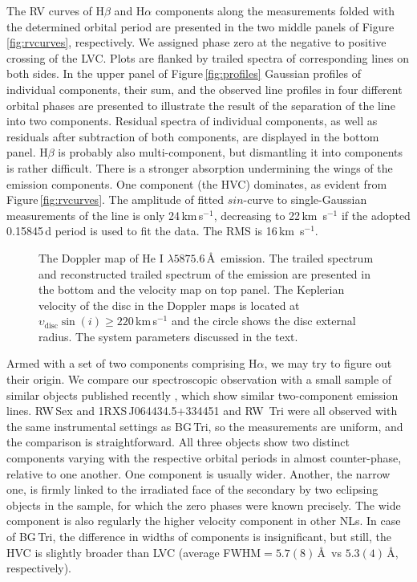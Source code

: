 \documentclass[fleqn,usenatbib]{mnras}
\def\bg{BG\,Tri}
\begin{document}
The RV curves of H$\beta$  and H$\alpha$ components along the measurements folded with the determined orbital period are presented in the two
middle panels of Figure\,\ref{fig:rvcurves}, respectively. We assigned phase zero at the negative to positive crossing of the LVC.  Plots are
flanked by trailed spectra of corresponding lines on both sides.
In the upper panel of Figure\,\ref{fig:profiles} Gaussian profiles of individual components, their sum, and the observed line profiles in four
different orbital phases are presented to illustrate the result of the separation of the line  into two components. Residual spectra of individual components,  as well as residuals after subtraction of both components, are displayed in the bottom panel.
H$\beta$ is probably also multi-component, but dismantling  it into components is rather difficult. There is a stronger absorption
undermining the wings of the emission components. One component (the HVC) dominates, as evident from Figure\,\ref{fig:rvcurves}. The amplitude of fitted $sin$-curve to single-Gaussian measurements of the line is only 24\,km\,s$^{-1}$, decreasing to 22\,km~s$^{-1}$ if the adopted 0.15845\,d
period is used to fit the data. The RMS is 16\,km~s$^{-1}$. 


\begin{figure}
\setlength{\unitlength}{1mm}
\caption{The Doppler map of He I $\lambda5875.6$\,\AA\ emission. The trailed spectrum and reconstructed trailed spectrum of
the emission are presented in the bottom and the velocity map on top panel. 
The Keplerian velocity of the disc in the Doppler maps is located at $ \upsilon_{\mathrm {disc}}\sin (i) \ge 220$\,km\,s$^{-1}$ and the circle
shows the disc external radius. The system parameters discussed in the text.}
\label{fig:tomohei}
\end{figure}



Armed with a set of two components comprising  H$\alpha$,   we may try to figure out their origin. 
We compare our spectroscopic observation with a small sample of similar objects published recently
\citep{2017MNRAS.464..104H,2017MNRAS.470.1960H}, which show  similar two-component emission lines. 
RW\,Sex and 1RXS\,J064434.5+334451 \citep{2017MNRAS.470.1960H} and  RW\, Tri \citep{Subebekova20} were all observed with the same instrumental
settings as \bg, so the measurements are uniform, and the comparison is straightforward. All three objects show two distinct components
varying with the respective orbital periods in almost counter-phase, relative to one another. One component is usually wider.
Another, the narrow one, is firmly linked to the irradiated face of the secondary by two eclipsing objects in the sample, for which the zero
phases were known precisely.
The wide component is also regularly the higher velocity component in other NLs. In case of \bg, the difference in widths of components is
insignificant, but still, the HVC is slightly broader than LVC (average FWHM$=5.7(8)$\,\AA\ vs $5.3(4)$\,\AA,  respectively). 
\end{document}
